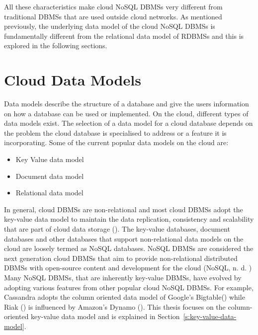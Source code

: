 All these characteristics make cloud \ac{NoSQL} \acp{DBMS} very different from traditional
\acp{DBMS} that are used outside cloud networks.  As mentioned previously,  
the underlying data model of the cloud
\ac{NoSQL} \acp{DBMS} is fundamentally different from the relational data model
of \acp{RDBMS} and this is explored in the following sections. 

\section{Cloud Data Models}\label{s:cloud-data-models}
Data models describe the structure of a database and give the users information
on how a database can be used or implemented.  On the cloud,   different types of
data models exist.  The selection of a data model for a cloud database depends on
the problem the cloud database is specialised to address or a feature it is
incorporating.  Some of the current popular data models on the cloud are:

\begin{itemize}
\item Key Value data model 

\item Document data model 

\item Relational data model
\end{itemize}

In general,   cloud \acp{DBMS} are non-relational and most cloud \acp{DBMS}
adopt the key-value data model to maintain the data replication,   consistency and
scalability that are part of cloud data storage (). The key-value
databases,   document databases and other databases that support non-relational data models
on the cloud are loosely termed as \ac{NoSQL} databases.  \ac{NoSQL} \acp{DBMS}
are considered the next generation cloud \acp{DBMS} that aim to provide
non-relational distributed \acp{DBMS} with open-source content and development
for the cloud (\ac{NoSQL},   n. d. ) Many \ac{NoSQL} \acp{DBMS},   that are inherently
key-value \acp{DBMS},   have evolved by adopting various features from other
popular cloud \ac{NoSQL} \acp{DBMS}.  For example,   Cassandra adopts the column
oriented data model of Google's Bigtable() while Riak () is influenced by
Amazon's Dynamo ().  This thesis focuses on the 
column-oriented key-value data model and is explained in
Section~\ref{s:key-value-data-model}. 

